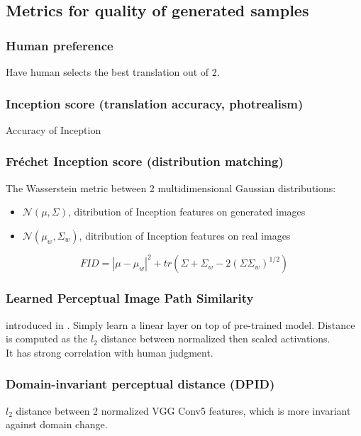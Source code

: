 \documentclass[../main.tex]{subfiles}
\begin{document}
\subsection{Metrics for quality of generated samples}
\subsubsection{Human preference}
Have human selects the best translation out of 2.

\subsubsection{Inception score (translation accuracy, photrealism)}
Accuracy of Inception

\subsubsection{Fréchet Inception score (distribution matching)}
The Wasserstein metric between 2 multidimensional Gaussian distributions:
\begin{itemize}
    \item $\mathcal{N}(\mu, \Sigma)$, ditribution of Inception features on generated images
    \item $\mathcal{N}(\mu_w, \Sigma_w)$, ditribution of Inception features on real images
\end{itemize}
\begin{equation}
    FID = |\mu - \mu_w|^2 + tr(\Sigma + \Sigma_w - 2 (\Sigma\Sigma_w)^{1/2})
\end{equation}

\subsubsection{Learned Perceptual Image Path Similarity}
introduced in \cite{unreasonable-deep-metric}. Simply learn a linear layer on top of pre-trained
model. Distance is computed as the $l_2$ distance between normalized then scaled activations. \\
It has strong correlation with human judgment.

\subsubsection{Domain-invariant perceptual distance (DPID)}
$l_2$ distance between 2 normalized VGG Conv5 features, which is more invariant against domain change.
\end{document}
